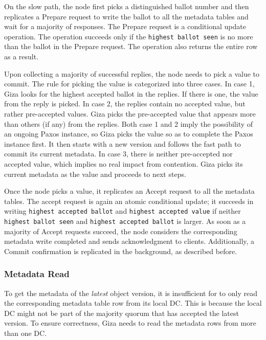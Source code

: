 On the slow path, the {\name} node first picks a distinguished ballot number and
then replicates a Prepare request to write the ballot to all the metadata tables
and wait for a majority of responses. The Prepare request is a conditional
update operation. The operation succeeds only if the {\tt highest ballot seen}
is no more than the ballot in the Prepare request. The operation also returns
the entire row as a result.

Upon collecting a majority of successful replies, the {\name} node needs to pick
a value to commit. The rule for picking the value is categorized into three
cases. In case 1, Giza looks for the highest accepted ballot in the replies. If
there is one, the value from the reply is picked. In case 2, the replies contain
no accepted value, but rather pre-accepted values. Giza picks the pre-accepted
value that appears more than others (if any) from the replies. Both case 1 and 2
imply the possibility of an ongoing Paxos instance, so Giza picks the value so
as to complete the Paxos instance first. It then starts with a new version and
follows the fast path to commit its current metadata. In case 3, there is
neither pre-accepted nor accepted value, which implies no real impact from
contention. Giza picks its current metadata as the value and proceeds to next
steps.

Once the {\name} node picks a value, it replicates an Accept request to all the
metadata tables. The accept request is again an atomic conditional update; it
succeeds in writing {\tt highest accepted ballot} and {\tt highest accepted
  value} if neither {\tt highest ballot seen} and {\tt highest accepted ballot}
is larger. 
As soon as a majority of Accept requests succeed, the \name node
considers the corresponding metadata write completed and sends acknowledgment to
clients. Additionally, a Commit confirmation is replicated in the background, as
described before.

\subsubsection{Metadata Read}

To get the metadata of the \emph{latest} object version, it is insufficient for
\name to only read the corresponding metadata table row from its local DC. This
is because the local DC might not be part of the majority quorum that has
accepted the latest version. To ensure correctness, Giza needs to read the
metadata rows from more than one DC.

